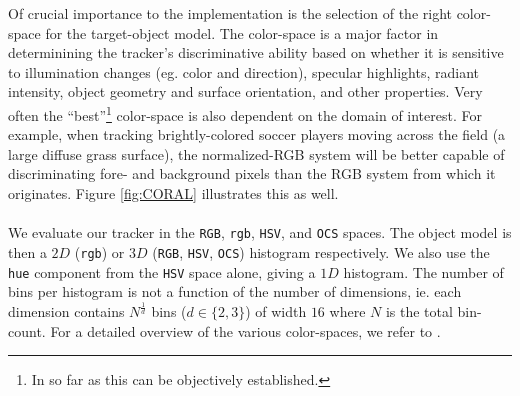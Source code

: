 \documentclass[a4paper,11pt]{article}
\begin{document}
			\noindent
			Of crucial importance to the implementation is the selection of the right
			color-space for the target-object model. The color-space is a major factor
			in determinining the tracker's discriminative ability based on whether it
			is sensitive to illumination changes (eg. color and direction), specular
			highlights, radiant intensity, object geometry and surface orientation,
			and other properties. Very often the ``best''\footnote{In so far as this
			can be objectively established.} color-space is also dependent on the
			domain of interest. For example, when tracking brightly-colored soccer
			players moving across the field (a large diffuse grass surface), the
			normalized-RGB system will be better capable of discriminating fore-
			and background pixels than the RGB system from which it originates.
			Figure \ref{fig:CORAL} illustrates this as well.
			\\ \\
			We evaluate our tracker in the \verb|RGB|, \verb|rgb|, \verb|HSV|, and
			\verb|OCS| spaces. The object model is then a $2D$ (\verb|rgb|) or $3D$
			(\verb|RGB|, \verb|HSV|, \verb|OCS|) histogram respectively. We also use the \verb|hue| component from the \verb|HSV| space alone, giving a $1D$ histogram. The number of bins per histogram is not a function of the number of dimensions, ie.	each dimension contains $N^{\frac{1}{d}}$ bins ($d \in \{2, 3\}$) of width	$16$ where $N$ is the total bin-count. For a detailed overview of the various color-spaces, we refer to \cite{COLOR}.
\end{document}
